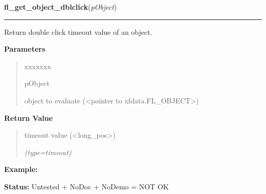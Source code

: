 \hspace{.8\funcindent}\begin{boxedminipage}{\funcwidth}

    \raggedright \textbf{fl\_get\_object\_dblclick}(\textit{pObject})

    \vspace{-1.5ex}

    \rule{\textwidth}{0.5\fboxrule}
\setlength{\parskip}{2ex}
    Return double click timeout value of an object.

\setlength{\parskip}{1ex}
      \textbf{Parameters}
      \vspace{-1ex}

      \begin{quote}
        \begin{Ventry}{xxxxxxx}

          \item[pObject]

          object to evaluate ({\textless}pointer to 
          xfdata.FL\_OBJECT{\textgreater})

        \end{Ventry}

      \end{quote}

      \textbf{Return Value}
    \vspace{-1ex}

      \begin{quote}
      timeout value ({\textless}long\_pos{\textgreater})

      {\it (type=timeout)}

      \end{quote}

\textbf{Example:} 

\textbf{Status:} Untested + NoDoc + NoDemo = NOT OK



    \end{boxedminipage}

    \label{xformslib:library:fl_set_object_geometry}

    \vspace{0.5ex}

